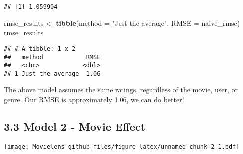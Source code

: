 \documentclass[]{article}
\newenvironment{Shaded}{\begin{snugshade}}{\end{snugshade}}
\newcommand{\DataTypeTok}[1]{\textcolor[rgb]{0.13,0.29,0.53}{#1}}
\newcommand{\DecValTok}[1]{\textcolor[rgb]{0.00,0.00,0.81}{#1}}
\newcommand{\KeywordTok}[1]{\textcolor[rgb]{0.13,0.29,0.53}{\textbf{#1}}}
\newcommand{\NormalTok}[1]{#1}
\newcommand{\OperatorTok}[1]{\textcolor[rgb]{0.81,0.36,0.00}{\textbf{#1}}}
\newcommand{\StringTok}[1]{\textcolor[rgb]{0.31,0.60,0.02}{#1}}
\begin{document}
\begin{verbatim}
## [1] 1.059904
\end{verbatim}

\begin{Shaded}
\begin{Highlighting}[]
\NormalTok{rmse_results <-}\StringTok{ }\KeywordTok{tibble}\NormalTok{(}\DataTypeTok{method =} \StringTok{"Just the average"}\NormalTok{, }\DataTypeTok{RMSE =}\NormalTok{ naive_rmse)}
\NormalTok{rmse_results}
\end{Highlighting}
\end{Shaded}

\begin{verbatim}
## # A tibble: 1 x 2
##   method            RMSE
##   <chr>            <dbl>
## 1 Just the average  1.06
\end{verbatim}

The above model assumes the same ratings, regardless of the movie, user,
or genre. Our RMSE is approximately 1.06, we can do better!

\hypertarget{model-2---movie-effect-1}{%
\subsection{3.3 Model 2 - Movie Effect}\label{model-2---movie-effect-1}}

\begin{Shaded}
\end{Shaded}

\texttt{[image: Movielens-github\_files/figure-latex/unnamed-chunk-2-1.pdf]}
\end{document}
